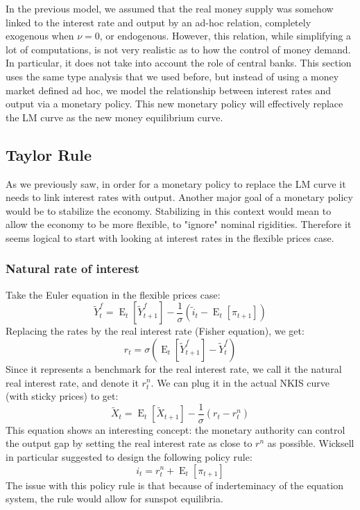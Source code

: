 \documentclass[12pt]{report}
\newcommand{\Et}[1]{\operatorname{E}_t\left[#1\right]}
\begin{document}
In the previous model, we assumed that the real money supply was somehow linked to the interest rate and output by an ad-hoc relation, completely exogenous when $\nu = 0$, or endogenous. However, this relation, while simplifying a lot of computations, is not very realistic as to how the control of money demand. In particular, it does not take into account the role of central banks. This section uses the same type analysis that we used before, but instead of using a money market defined ad hoc, we model the relationship between interest rates and output via a monetary policy. This new monetary policy will effectively replace the LM curve as the new money equilibrium curve.

\subsection{Taylor Rule}

As we previously saw, in order for a monetary policy to replace the LM curve it needs to link interest rates with output. Another major goal of a monetary policy would be to stabilize the economy. Stabilizing in this context would mean to allow the economy to be more flexible, to "ignore" nominal rigidities. Therefore it seems logical to start with looking at interest rates in the flexible prices case.

\subsubsection{Natural rate of interest}

Take the Euler equation in the flexible prices case: $$ \tilde Y_t^f = \Et{\tilde Y_{t+1}^f} - \frac{1}{\sigma}\left(\tilde i_t - \Et{\pi_{t+1}}\right) $$ Replacing the rates by the real interest rate (Fisher equation), we get: $$r_t = \sigma \left( \Et{\tilde Y_{t+1}^f} - \tilde Y_t^f \right) $$ Since it represents a benchmark for the real interest rate, we call it the natural real interest rate, and denote it $r_t^n$. We can plug it in the actual NKIS curve (with sticky prices) to get: $$\tilde X_t = \Et{\tilde X_{t+1}} - \frac{1}{\sigma}\left( r_t - r_t^n\right) $$ This equation shows an interesting concept: the monetary authority can control the output gap by setting the real interest rate as close to $r^n$ as possible. Wicksell in particular suggested to design the following policy rule: $$i_t = r_t^n + \Et{\pi_{t+1}} $$ The issue with this policy rule is that because of inderteminacy of the equation system, the rule would allow for sunspot equilibria.
\end{document}
